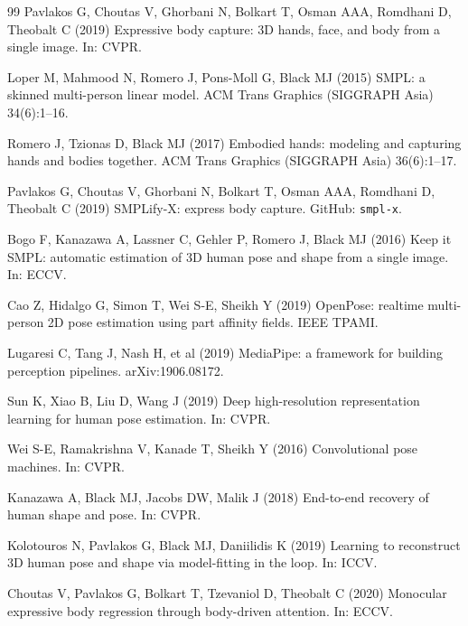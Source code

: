\documentclass[twocolumn,10pt]{svjour3}
\begin{document}

\begin{thebibliography}{99}
Pavlakos G, Choutas V, Ghorbani N, Bolkart T, Osman AAA, Romdhani D, Theobalt C (2019) Expressive body capture: 3D hands, face, and body from a single image. In: CVPR.

Loper M, Mahmood N, Romero J, Pons-Moll G, Black MJ (2015) SMPL: a skinned multi-person linear model. ACM Trans Graphics (SIGGRAPH Asia) 34(6):1--16.

Romero J, Tzionas D, Black MJ (2017) Embodied hands: modeling and capturing hands and bodies together. ACM Trans Graphics (SIGGRAPH Asia) 36(6):1--17.

Pavlakos G, Choutas V, Ghorbani N, Bolkart T, Osman AAA, Romdhani D, Theobalt C (2019) SMPLify-X: express body capture. GitHub: \texttt{smpl-x}.

Bogo F, Kanazawa A, Lassner C, Gehler P, Romero J, Black MJ (2016) Keep it SMPL: automatic estimation of 3D human pose and shape from a single image. In: ECCV.

Cao Z, Hidalgo G, Simon T, Wei S-E, Sheikh Y (2019) OpenPose: realtime multi-person 2D pose estimation using part affinity fields. IEEE TPAMI.

Lugaresi C, Tang J, Nash H, et al (2019) MediaPipe: a framework for building perception pipelines. arXiv:1906.08172.

Sun K, Xiao B, Liu D, Wang J (2019) Deep high-resolution representation learning for human pose estimation. In: CVPR.

Wei S-E, Ramakrishna V, Kanade T, Sheikh Y (2016) Convolutional pose machines. In: CVPR.

Kanazawa A, Black MJ, Jacobs DW, Malik J (2018) End-to-end recovery of human shape and pose. In: CVPR.

Kolotouros N, Pavlakos G, Black MJ, Daniilidis K (2019) Learning to reconstruct 3D human pose and shape via model-fitting in the loop. In: ICCV.

Choutas V, Pavlakos G, Bolkart T, Tzevaniol D, Theobalt C (2020) Monocular expressive body regression through body-driven attention. In: ECCV.


\end{thebibliography}
\end{document}
